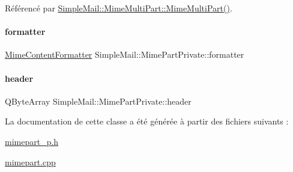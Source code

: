 Référencé par \hyperlink{class_simple_mail_1_1_mime_multi_part_ab739aa2f5357ecacb56b0ef3fa0aa2eb}{Simple\+Mail\+::\+Mime\+Multi\+Part\+::\+Mime\+Multi\+Part()}.

\mbox{\label{class_simple_mail_1_1_mime_part_private_a0a630f148c8e8070c73b60c75e9777a4}} 
\paragraph{\texorpdfstring{formatter}{formatter}}
{\footnotesize\ttfamily \hyperlink{class_simple_mail_1_1_mime_content_formatter}{Mime\+Content\+Formatter} Simple\+Mail\+::\+Mime\+Part\+Private\+::formatter}

\mbox{\label{class_simple_mail_1_1_mime_part_private_a5308879f21bcc7dbb90c2138156f1aa6}} 
\paragraph{\texorpdfstring{header}{header}}
{\footnotesize\ttfamily Q\+Byte\+Array Simple\+Mail\+::\+Mime\+Part\+Private\+::header}



La documentation de cette classe a été générée à partir des fichiers suivants \+:\begin{DoxyCompactItemize}
\item 
\hyperlink{mimepart__p_8h}{mimepart\+\_\+p.\+h}\item 
\hyperlink{mimepart_8cpp}{mimepart.\+cpp}\end{DoxyCompactItemize}
